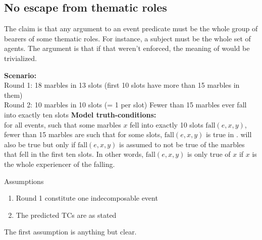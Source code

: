 \subsection{No escape from thematic roles}

The claim is that any argument to an event predicate must be the whole group of bearers of some thematic roles. For instance, a subject must be the whole set of agents. The argument is that if that weren't enforced, the meaning of \cnextx would be trivialized.

\pex
\a \textbf{Scenario:} \\
Round 1: 18 marbles in 13 slots (first 10 slots have more than 15 marbles in them) \\
Round 2: 10 marbles in 10 slots (= 1 per slot)
\a Fewer than 15 marbles ever fall into exactly ten slots
\a \textbf{Model truth-conditions:} \\
for all events, such that some marbles $x$ fell into exactly 10 slots $\text{fall}(e, x, y)$,
fewer than 15 marbles are such that for some slots, $\text{fall}(e, x, y)$
\xe
%
 is true in .  will also be true but only if $\text{fall}(e, x, y)$ is assumed to not be true of the marbles that fell in the first ten slots. In other words, $\text{fall}(e, x, y)$ is only true of $x$ if $x$ is the whole experiencer of the falling.

\begin{boxy}{Assumptions}
\begin{enumerate}
\item Round 1 constitute one indecomposable event
\item The predicted TCs are as stated
\end{enumerate}
\end{boxy}
%
The first assumption is anything but clear. 


